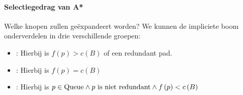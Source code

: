 \paragraph{Selectiegedrag van A*}
Welke knopen zullen geëxpandeert worden? We kunnen de impliciete boom onderverdelen in drie verschillende groepen:
\begin{itemize}
 \item {}: Hierbij is $f\left(p\right)>c\left(B\right)$ of een redundant pad.
 \item {}: Hierbij is $f\left(p\right)=c\left(B\right)$
 \item {}: Hierbij is $p\in\mbox{Queue}\wedge p\mbox{ is niet redundant}\wedge f\left(p\right)<c\left(B\right)$
\end{itemize}
